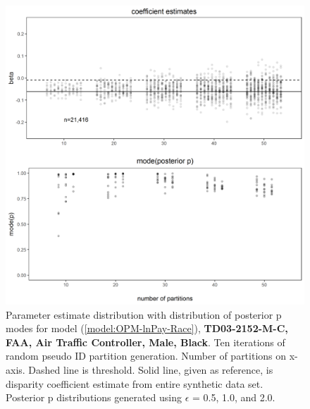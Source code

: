 \documentclass[10pt, letterpaper]{article}
\begin{document}
\begin{spacing}{1.0}
\begin{figure}[h!]
    \centering
    \includegraphics[width=5in]{images/RacePayDifferentialBetaWithPosteriorDistribution-TD03-2152-M-C.png}
    \caption{Parameter estimate distribution with distribution of posterior p modes for model (\ref{model:OPM-lnPay-Race}), \textbf{TD03-2152-M-C, FAA, Air Traffic Controller, Male, Black}.  Ten iterations of random pseudo ID partition generation.  Number of partitions on x-axis.  Dashed line is threshold.  Solid line, given as reference, is disparity coefficient estimate from entire synthetic data set.  Posterior p distributions generated using $\epsilon$ = 0.5, 1.0, and 2.0.}
    \label{figure:RacePayDifferentialBetaWithPosteriorDistribution-TD03-2152-M-C}
\end{figure}

\clearpage


\end{spacing}
\end{document}
